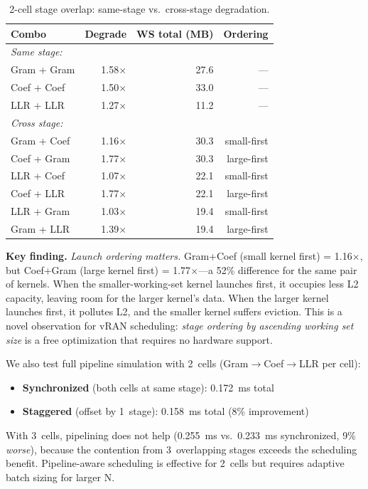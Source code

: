\begin{table}[h]
\centering
\small
\caption{2-cell stage overlap: same-stage vs.\ cross-stage degradation.}
\label{tab:pipeline}
\begin{tabular}{@{}lrrr@{}}
\toprule
Combo & Degrade & WS total (MB) & Ordering \\
\midrule
\textit{Same stage:} & & & \\
Gram + Gram & 1.58$\times$ & 27.6 & --- \\
Coef + Coef & 1.50$\times$ & 33.0 & --- \\
LLR + LLR & 1.27$\times$ & 11.2 & --- \\
\textit{Cross stage:} & & & \\
Gram + Coef & 1.16$\times$ & 30.3 & small-first \\
Coef + Gram & 1.77$\times$ & 30.3 & large-first \\
LLR + Coef & 1.07$\times$ & 22.1 & small-first \\
Coef + LLR & 1.77$\times$ & 22.1 & large-first \\
LLR + Gram & 1.03$\times$ & 19.4 & small-first \\
Gram + LLR & 1.39$\times$ & 19.4 & large-first \\
\bottomrule
\end{tabular}
\end{table}

\textbf{Key finding.} \emph{Launch ordering matters.} Gram+Coef (small kernel first) = 1.16$\times$, but Coef+Gram (large kernel first) = 1.77$\times$---a 52\% difference for the same pair of kernels. When the smaller-working-set kernel launches first, it occupies less L2 capacity, leaving room for the larger kernel's data. When the larger kernel launches first, it pollutes L2, and the smaller kernel suffers eviction. This is a novel observation for vRAN scheduling: \emph{stage ordering by ascending working set size} is a free optimization that requires no hardware support.

We also test full pipeline simulation with 2~cells (Gram$\rightarrow$Coef$\rightarrow$LLR per cell):
\begin{itemize}[leftmargin=*,nosep]
\item \textbf{Synchronized} (both cells at same stage): 0.172~ms total
\item \textbf{Staggered} (offset by 1~stage): 0.158~ms total (8\% improvement)
\end{itemize}

With 3~cells, pipelining does not help (0.255~ms vs.\ 0.233~ms synchronized, 9\% \emph{worse}), because the contention from 3~overlapping stages exceeds the scheduling benefit. Pipeline-aware scheduling is effective for 2~cells but requires adaptive batch sizing for larger N.

